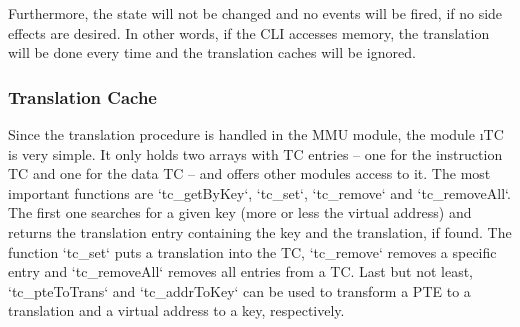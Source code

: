 Furthermore, the state will not be changed and no events will be fired, if no side effects are desired. In other words, if the CLI accesses memory, the translation will be done every time and the translation caches will be ignored.

\subsubsection{Translation Cache}

Since the translation procedure is handled in the MMU module, the module \i{TC} is very simple. It only holds two arrays with TC entries -- one for the instruction TC and one for the data TC -- and offers other modules access to it. The most important functions are `tc_getByKey`, `tc_set`, `tc_remove` and `tc_removeAll`. The first one searches for a given key (\ie more or less the virtual address) and returns the translation entry containing the key and the translation, if found. The function `tc_set` puts a translation into the TC, `tc_remove` removes a specific entry and `tc_removeAll` removes all entries from a TC. Last but not least, `tc_pteToTrans` and `tc_addrToKey` can be used to transform a PTE to a translation and a virtual address to a key, respectively.

